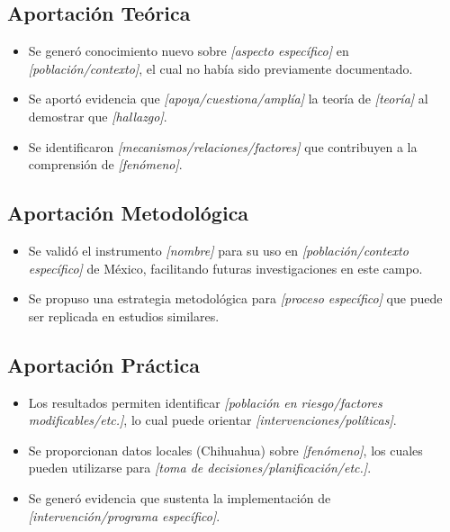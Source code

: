 \subsection{Aportación Teórica}
\label{subsec:aportacion_teorica}

\begin{itemize}
    \item Se generó conocimiento nuevo sobre \textit{[aspecto específico]} en \textit{[población/contexto]}, el cual no había sido previamente documentado.
    
    \item Se aportó evidencia que \textit{[apoya/cuestiona/amplía]} la teoría de \textit{[teoría]} al demostrar que \textit{[hallazgo]}.
    
    \item Se identificaron \textit{[mecanismos/relaciones/factores]} que contribuyen a la comprensión de \textit{[fenómeno]}.
\end{itemize}

\subsection{Aportación Metodológica}
\label{subsec:aportacion_metodologica}

\begin{itemize}
    \item Se validó el instrumento \textit{[nombre]} para su uso en \textit{[población/contexto específico]} de México, facilitando futuras investigaciones en este campo.
    
    \item Se propuso una estrategia metodológica para \textit{[proceso específico]} que puede ser replicada en estudios similares.
\end{itemize}

\subsection{Aportación Práctica}
\label{subsec:aportacion_practica}

\begin{itemize}
    \item Los resultados permiten identificar \textit{[población en riesgo/factores modificables/etc.]}, lo cual puede orientar \textit{[intervenciones/políticas]}.
    
    \item Se proporcionan datos locales (Chihuahua) sobre \textit{[fenómeno]}, los cuales pueden utilizarse para \textit{[toma de decisiones/planificación/etc.]}.
    
    \item Se generó evidencia que sustenta la implementación de \textit{[intervención/programa específico]}.
\end{itemize}

